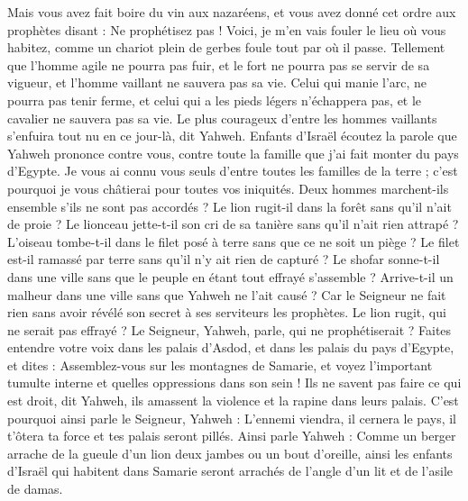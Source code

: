 \begin{multicols}{2}
Mais vous avez fait boire du vin aux nazaréens, et vous avez donné cet ordre aux prophètes disant : Ne prophétisez pas !
Voici, je m’en vais fouler le lieu où vous habitez, comme un chariot plein de gerbes foule tout par où il passe.
Tellement que l’homme agile ne pourra pas fuir, et le fort ne pourra pas se servir de sa vigueur, et l’homme vaillant ne sauvera pas sa vie.
Celui qui manie l'arc, ne pourra pas tenir ferme, et celui qui a les pieds légers n'échappera pas, et le cavalier ne sauvera pas sa vie.
Le plus courageux d’entre les hommes vaillants s'enfuira tout nu en ce jour-là, dit Yahweh.
\VerseOne{}Enfants d’Israël écoutez la parole que Yahweh prononce contre vous, contre toute la famille que j'ai fait monter du pays d'Egypte.
Je vous ai connu vous seuls d'entre toutes les familles de la terre ; c'est pourquoi je vous châtierai pour toutes vos iniquités.
Deux hommes marchent-ils ensemble s’ils ne sont pas accordés ?
Le lion rugit-il dans la forêt sans qu’il n'ait de proie ? Le lionceau jette-t-il son cri de sa tanière sans qu’il n'ait rien attrapé ?
L'oiseau tombe-t-il dans le filet posé à terre sans que ce ne soit un piège ? Le filet est-il ramassé par terre sans qu’il n’y ait rien de capturé ?
Le shofar sonne-t-il dans une ville sans que le peuple en étant tout effrayé s’assemble ? Arrive-t-il un malheur dans une ville sans que Yahweh ne l’ait causé ?
Car le Seigneur ne fait rien sans avoir révélé son secret à ses serviteurs les prophètes.
Le lion rugit, qui ne serait pas effrayé ? Le Seigneur, Yahweh, parle, qui ne prophétiserait ?
Faites entendre votre voix dans les palais d'Asdod, et dans les palais du pays d'Egypte, et dites : Assemblez-vous sur les montagnes de Samarie, et voyez l’important tumulte interne et quelles oppressions dans son sein !
Ils ne savent pas faire ce qui est droit, dit Yahweh, ils amassent la violence et la rapine dans leurs palais.
C'est pourquoi ainsi parle le Seigneur, Yahweh : L'ennemi viendra, il cernera le pays, il t'ôtera ta force et tes palais seront pillés.
Ainsi parle Yahweh : Comme un berger arrache de la gueule d'un lion deux jambes ou un bout d'oreille, ainsi les enfants d'Israël qui habitent dans Samarie seront arrachés de l’angle d’un lit et de l’asile de damas.

\end{multicols}

